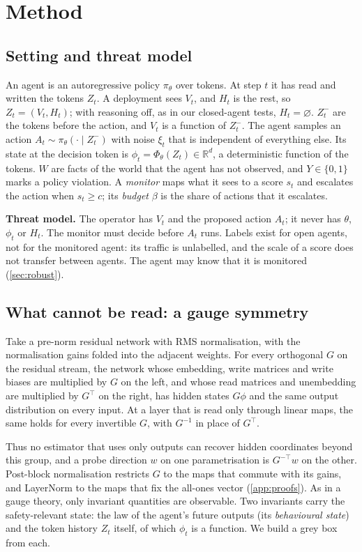 \section{Method}
\label{sec:method}


\subsection{Setting and threat model}
\label{sec:setting}
An agent is an autoregressive policy $\pi_\theta$ over tokens. At step $t$ it has read and written the tokens $Z_t$. A deployment sees $V_t$, and $H_t$ is the rest, so $Z_t=(V_t,H_t)$; with reasoning off, as in our closed-agent tests, $H_t=\varnothing$. $Z^-_t$ are the tokens before the action, and $V_t$ is a function of $Z^-_t$. The agent samples an action $A_t\sim\pi_\theta(\cdot\mid Z^-_t)$ with noise $\xi_t$ that is independent of everything else. Its state at the decision token is $\phi_t=\Phi_\theta(Z_t)\in\mathbb{R}^d$, a deterministic function of the tokens. $W$ are facts of the world that the agent has not observed, and $Y\in\{0,1\}$ marks a policy violation. A \emph{monitor} maps what it sees to a score $s_t$ and escalates the action when $s_t\ge c$; its \emph{budget} $\beta$ is the share of actions that it escalates.

\textbf{Threat model.} The operator has $V_t$ and the proposed action $A_t$; it never has $\theta$, $\phi_t$ or $H_t$. The monitor must decide before $A_t$ runs. Labels exist for open agents, not for the monitored agent: its traffic is unlabelled, and the scale of a score does not transfer between agents. The agent may know that it is monitored (\cref{sec:robust}).

\subsection{What cannot be read: a gauge symmetry}
\begin{proposition}[gauge]\label{prop:gauge}
Take a pre-norm residual network with RMS normalisation, with the normalisation gains folded into the adjacent weights. For every orthogonal $G$ on the residual stream, the network whose embedding, write matrices and write biases are multiplied by $G$ on the left, and whose read matrices and unembedding are multiplied by $G^{\top}$ on the right, has hidden states $G\phi$ and the same output distribution on every input. At a layer that is read only through linear maps, the same holds for every invertible $G$, with $G^{-1}$ in place of $G^{\top}$.
\end{proposition}
Thus no estimator that uses only outputs can recover hidden coordinates beyond this group, and a probe direction $w$ on one parametrisation is $G^{-\top}w$ on the other. Post-block normalisation restricts $G$ to the maps that commute with its gains, and LayerNorm to the maps that fix the all-ones vector (\cref{app:proofs}). As in a gauge theory, only invariant quantities are observable. Two invariants carry the safety-relevant state: the law of the agent's future outputs (its \emph{behavioural state}) and the token history $Z_t$ itself, of which $\phi_t$ is a function. We build a grey box from each.

